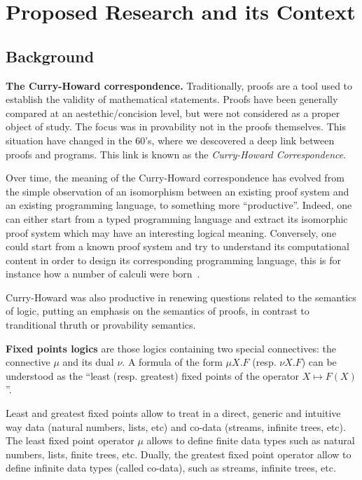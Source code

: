 \section{Proposed Research and its Context}

\subsection{Background}

\textbf{The Curry-Howard correspondence.}
Traditionally, proofs are a tool used to establish the validity
of mathematical statements. 
%
Proofs  have been generally  compared at an aestethic/concision level, but
were not considered as a proper object of study. The focus was in provability
 not in the proofs themselves.
%
This situation have changed in the 60's, where we descovered a deep link between proofs and programs. This link is known as the \textit{Curry-Howard Correspondence}.
%
 

  Over time, the meaning of the Curry-Howard correspondence has evolved from
  the simple observation of an isomorphism between an existing
  proof system and an existing programming language, to something more “productive”.
Indeed, one can either start from a typed programming language and extract its isomorphic proof system which may have an interesting logical meaning.
Conversely, one could start from a known proof system and try to understand its computational content
in order to design its
  corresponding programming language,
  this is for instance how a number of calculi were  born~\cite{Parigot92,CurienH00, Munch09Foc}.

  Curry-Howard was also productive in renewing questions related to the
  semantics of logic, putting an emphasis on the semantics of proofs, in contrast to tranditional thruth or provability semantics. 
    
\bigskip 
  \textbf{Fixed points logics} are those logics containing two special connectives: the connective $\mu$ and its dual $\nu$. A formula of the form $\mu X. F$ (resp. $\nu X. F$) can be understood as the “least (resp. greatest) fixed points of the operator  $X\mapsto F(X)$”.
  
Least and greatest fixed points allow to treat in a direct, generic and intuitive way data (natural numbers, lists, etc) and co-data (streams, infinite trees, etc). The least fixed point operator $\mu$ allows to define
finite data types such as natural numbers,  lists, finite trees, etc.
Dually, the greatest fixed point operator allow to
define infinite data types (called co-data), such as streams, infinite trees, etc.


